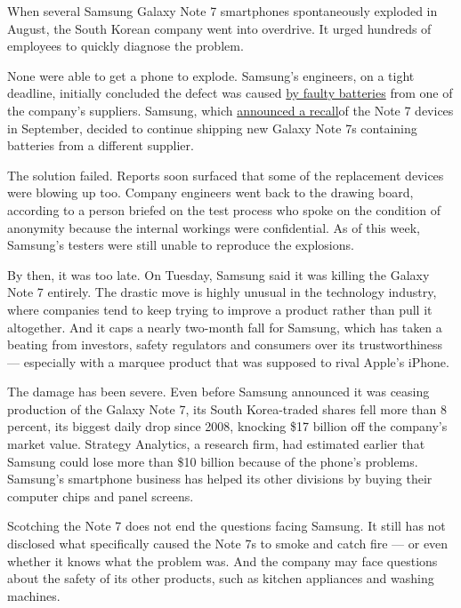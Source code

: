 When several Samsung Galaxy Note 7 smartphones spontaneously exploded in
August, the South Korean company went into overdrive. It urged hundreds
of employees to quickly diagnose the problem.

None were able to get a phone to explode. Samsung's engineers, on a
tight deadline, initially concluded the defect was caused
\href{http://www.nytimes.com/2016/09/03/technology/samsungs-recall-the-problem-with-lithium-ion-batteries.html}{by
faulty batteries} from one of the company's suppliers. Samsung, which
\href{http://www.nytimes.com/2016/09/03/business/samsung-galaxy-note-battery.html}{announced
a recall}of the Note 7 devices in September, decided to continue
shipping new Galaxy Note 7s containing batteries from a different
supplier.

The solution failed. Reports soon surfaced that some of the replacement
devices were blowing up too. Company engineers went back to the drawing
board, according to a person briefed on the test process who spoke on
the condition of anonymity because the internal workings were
confidential. As of this week, Samsung's testers were still unable to
reproduce the explosions.

By then, it was too late. On Tuesday, Samsung said it was killing the
Galaxy Note 7 entirely. The drastic move is highly unusual in the
technology industry, where companies tend to keep trying to improve a
product rather than pull it altogether. And it caps a nearly two-month
fall for Samsung, which has taken a beating from investors, safety
regulators and consumers over its trustworthiness --- especially with a
marquee product that was supposed to rival Apple's iPhone.

The damage has been severe. Even before Samsung announced it was ceasing
production of the Galaxy Note 7, its South Korea-traded shares fell more
than 8 percent, its biggest daily drop since 2008, knocking \$17 billion
off the company's market value. Strategy Analytics, a research firm, had
estimated earlier that Samsung could lose more than \$10 billion because
of the phone's problems. Samsung's smartphone business has helped its
other divisions by buying their computer chips and panel screens.

Scotching the Note 7 does not end the questions facing Samsung. It still
has not disclosed what specifically caused the Note 7s to smoke and
catch fire --- or even whether it knows what the problem was. And the
company may face questions about the safety of its other products, such
as kitchen appliances and washing machines.

